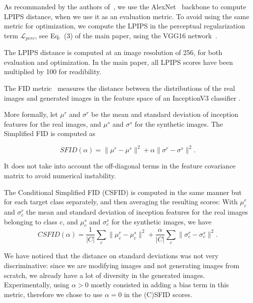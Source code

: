 As recommanded by the authors of~\cite{zhang18cvpr}, we use the
 AlexNet~\cite{krizhevsky12nips} backbone to compute LPIPS distance, when we use it as
  an evaluation metric. 
To avoid using the same metric for optimization,  we compute the LPIPS in the
 perceptual regularization term $\mathcal{L}_{perc}$, see Eq.\ (3) of the main paper,
  using the VGG16 network~\cite{krizhevsky12nips}.

The LPIPS distance is computed at an image resolution of 256, for both evaluation and 
optimization.
In the main paper, all LPIPS scores have been multiplied by 100 for readibility.

The FID metric~\cite{heusel17nips} measures the distance between the distributions of
 the real images and generated images in the feature space of an InceptionV3 
 classifier \cite{szegedy16cvpr}.

More formally, let $\mu^r$ and $\sigma^r$ be the mean and standard deviation of 
inception features for the real images, and $\mu^s$ and $\sigma^s$ for the synthetic 
images. The Simplified FID \cite{kim2020simplified} is computed as 

\begin{equation}
SFID(\alpha) = \lVert \mu^r - \mu^s \rVert ^2 + \alpha \lVert\sigma^r - \sigma^s\rVert^2.
\end{equation}

It does not take into account the off-diagonal terms in the feature covariance
 matrix to avoid numerical instability.

The  Conditional Simplified FID (CSFID) is computed in the same manner but for
 each target class separately, and then averaging the resulting scores: 
 With $\mu^r_c$ and $\sigma^r_c$ the mean and standard deviation of inception 
 features for the real images belonging to class $c$, and $\mu^s_c$ and $\sigma^s_c$ 
 for the synthetic images, we have
\begin{equation}
CSFID(\alpha) = \frac{1}{|C|} \sum_c \lVert \mu^r_c - \mu^s_c \rVert ^2 + \frac{\alpha}{|C|} \sum_c \lVert\sigma^r_c - \sigma^s_c\rVert^2.
\label{eq:sfid}
\end{equation}

 We have noticed that the distance on standard deviations was not very discriminative: 
 since we are modifying images and not generating images from scratch, we already have
  a lot of diversity in the generated images. Experimentally, using $\alpha > 0$ mostly consisted in adding a bias term in this metric, therefore we chose to use $\alpha =0 $ in the (C)SFID scores. 

